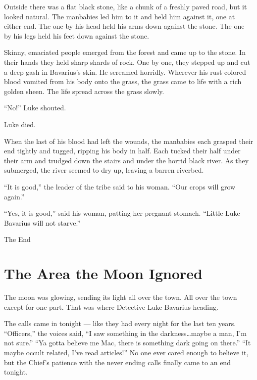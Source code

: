 Outside there was a flat black stone, like a chunk of a freshly
paved road, but it looked natural. The manbabies led him to it and
held him against it, one at either end. The one by his head held
his arms down against the stone. The one by his legs held his feet
down against the stone.

Skinny, emaciated people emerged from the forest and came up to the
stone. In their hands they held sharp shards of rock. One by one,
they stepped up and cut a deep gash in Bavarius's skin. He screamed
horridly. Wherever his rust-colored blood vomited from his body
onto the grass, the grass came to life with a rich golden sheen.
The life spread across the grass slowly.

``No!'' Luke shouted.

Luke died.

When the last of his blood had left the wounds, the manbabies each
grasped their end tightly and tugged, ripping his body in half.
Each tucked their half under their arm and trudged down the stairs
and under the horrid black river. As they submerged, the river
seemed to dry up, leaving a barren riverbed.

``It is good,'' the leader of the tribe said to his woman. ``Our crops
will grow again.''

``Yes, it is good,'' said his woman, patting her pregnant stomach.
``Little Luke Bavarius will not starve.''



The End 
 



\chapter{The Area the Moon Ignored}



The moon was glowing, sending its light all over the town. All over
the town except for one part. That was where Detective Luke
Bavarius heading.



The calls came in tonight --- like they had every night for the
last ten years. ``Officers,'' the voices said, ``I
saw something in the darkness{\ldots}maybe a man, I'm not sure.''
``Ya gotta believe me Mac, there is something dark going on
there.'' ``It maybe occult related, I've read
articles!'' No one ever cared enough to believe it, but the
Chief's patience with the never ending calls finally came to an end
tonight.



